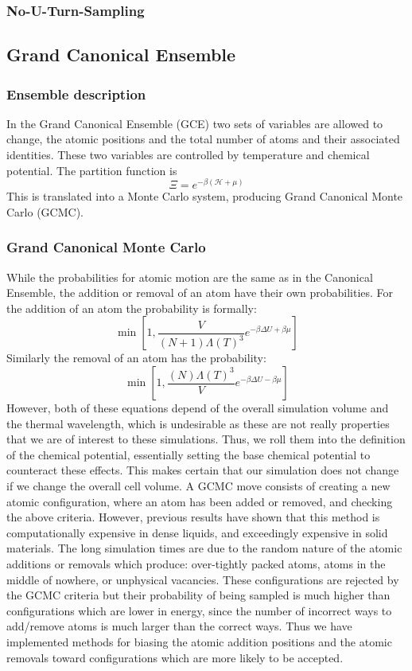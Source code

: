 \subsubsection{No-U-Turn-Sampling}
\subsection{Grand Canonical Ensemble}
\subsubsection{Ensemble description}
In the Grand Canonical Ensemble (GCE) two sets of variables are allowed to change, the atomic positions and the total number of atoms and their associated identities.  
These two variables are controlled by temperature and chemical potential.  
The partition function is
\begin{equation}
  \Xi = e^{-\beta(\mathcal{H} +\mu)}
\end{equation}
This is translated into a Monte Carlo system, producing Grand Canonical Monte Carlo (GCMC).
\subsubsection{Grand Canonical Monte Carlo}
While the probabilities for atomic motion are the same as in the Canonical Ensemble, the addition or removal of an atom have their own probabilities. For the addition of an atom the probability is formally:
\begin{equation}
  \min[1, \frac{V}{(N+1) \Lambda(T)^{3}}e^{-\beta\Delta U + \beta \mu}]
\end{equation}
Similarly the removal of an atom has the probability:
\begin{equation}
  \min[1, \frac{(N)\Lambda(T)^{3}}{V}e^{-\beta\Delta U - \beta \mu}]
\end{equation}
However, both of these equations depend of the overall simulation volume and the thermal wavelength, which is undesirable as these are not really properties that we are of interest to these simulations.
Thus, we roll them into the definition of the chemical potential, essentially setting the base chemical potential to counteract these effects.
This makes certain that our simulation does not change if we change the overall cell volume.
A GCMC move consists of creating a new atomic configuration, where an atom has been added or removed, and checking the above criteria.
However, previous results have shown that this method is computationally expensive in dense liquids, and exceedingly expensive in solid materials.
The long simulation times are due to the random nature of the atomic additions or removals which produce: over-tightly packed atoms, atoms in the middle of nowhere, or unphysical vacancies.  
These configurations are rejected by the GCMC criteria but their probability of being sampled is much higher than configurations which are lower in energy, since the number of incorrect ways to add/remove atoms is much larger than the correct ways.
Thus we have implemented methods for biasing the atomic addition positions and the atomic removals toward configurations which are more likely to be accepted.
